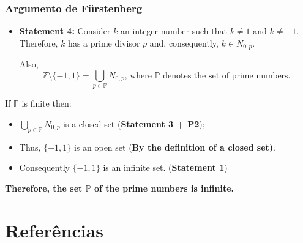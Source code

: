 \documentclass[10pt]{beamer}
\begin{document}
 \begin{frame}
\frametitle{Argumento de F\"{u}rstenberg}

\begin{exampleblock}
  
  \begin{itemize}
  \item \textbf{Statement 4:} Consider $k$ an integer number such that $k \neq 1$ and $k \neq -1$. Therefore, $k$ has a prime divisor $p$ and, consequently, $k \in N_{0,p}$.
   
   Also,
    $$\mathbb{Z} \setminus \{-1,1 \} = \bigcup_{p \in \mathbb{P}} N_{0,p} \mbox{, where } \mathbb{P}
    \mbox{ denotes the set of prime numbers.}$$
  \end{itemize}
  \end{exampleblock}

If $\mathbb{P}$ is finite then:
\begin{itemize}
\item  $\bigcup_{p \in \mathbb{P}} N_{0,p}$ is a closed set (\textbf{Statement 3 + P2});
\item Thus, $\{ -1, 1\}$ is an open set (\textbf{By the definition of a closed set)}.
  \item Consequently $\{ -1, 1\}$ is an infinite set. (\textbf{Statement 1})

  \end{itemize}

  \begin{exampleblock}

    \textbf{Therefore, the set $\mathbb{P}$ of the prime numbers is infinite.}
    \end{exampleblock}
 \end{frame}  



\section*{Refer\^encias}
\end{document}
